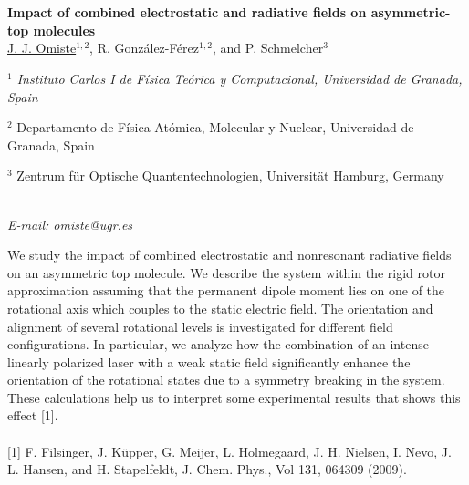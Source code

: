 \section*{}
\begin{center}
{\bf \Large
Impact of combined electrostatic and radiative fields on asymmetric-top molecules
}
\\
\vspace{0.5cm}
\underline{J. J. Omiste}$^{1,2}$, R. González-Férez$^{1,2}$, and P. Schmelcher$^{3}$
\\
\vspace{0.5cm}
{\it
$^{1}$ Instituto Carlos I de Física Teórica y Computacional, Universidad de Granada, Spain

$^{2}$ Departamento de Física Atómica, Molecular y Nuclear, Universidad de Granada, Spain

$^{3}$ Zentrum für Optische Quantentechnologien, Universität Hamburg, Germany
}
\\
\vspace{0.5cm}
{\it E-mail: omiste@ugr.es}
\\
\vspace{0.5cm}
\end{center}
We study the impact of combined electrostatic and nonresonant radiative fields on an asymmetric
top molecule. We describe the system within the rigid rotor approximation assuming that
the permanent dipole moment lies on one of the rotational axis which couples to the static electric field.
The orientation and alignment of several rotational levels is investigated for different field configurations.
In particular, we analyze how the combination of an intense linearly polarized laser with
a weak static field significantly enhance the orientation of the rotational states due to a symmetry breaking in the system.
These calculations help us to interpret some experimental results that
shows this effect [1].
\\
\vspace{0.5cm}
\\
{\footnotesize
[1] F. Filsinger, J. Küpper, G. Meijer, L. Holmegaard, J. H. Nielsen, I. Nevo, J. L. Hansen, and H. Stapelfeldt, J. Chem.
Phys., Vol 131, 064309 (2009).
}

\newpage
\setcounter{figure}{0}
